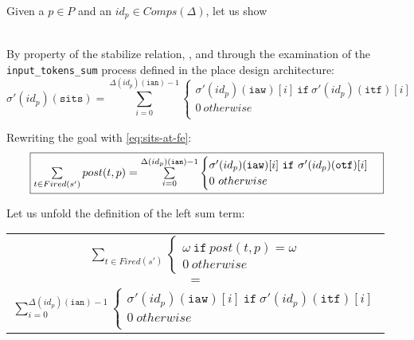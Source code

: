 \documentclass[dvipsnames,12pt]{article}
\begin{document}
\begin{niproof}
  Given a $p\in{}P$ and an $id_p\in{}Comps(\Delta)$, let us show\\
  \\

  \exP{}
  
  By property of the stabilize relation, \InCsCompP, and through the
  examination of the \texttt{input_tokens_sum} process defined in the
  place design architecture:
  \begin{equation}
    \label{eq:sits-at-fe}
    \sigma'(id_p)(\texttt{sits})=\sum\limits_{i=0}^{\Delta(id_p)(\texttt{ian})-1}
    \begin{cases}
      \sigma'(id_p)(\texttt{iaw})[i]~\mathtt{if}~\sigma'(id_p)(\texttt{itf})[i]\\
      0~otherwise \\
    \end{cases}
  \end{equation}

  Rewriting the goal with \eqref{eq:sits-at-fe}:\\
  \begin{equation*}
    \fbox{$
      \sum\limits_{t\in{}Fired(s')}post(t,p)=\sum\limits_{i=0}^{\Delta(id_p)(\texttt{ian})-1}
      \begin{cases}
        \sigma'(id_p)(\texttt{iaw})[i]~\mathtt{if}~\sigma'(id_p)(\texttt{otf})[i]\\
        0~otherwise \\
      \end{cases}$}
  \end{equation*}

  Let us unfold the definition of the left sum term:\\
  \begin{frameb}
    \begin{tabular}{c} $\sum\limits_{t\in{}Fired(s')}
      \begin{cases}
        \omega~\mathtt{if}~post(t,p)=\omega \\
        0~otherwise
      \end{cases}$ \\
      $=$ \\
      $\sum\limits_{i=0}^{\Delta(id_p)(\texttt{ian})-1}
      \begin{cases}
        \sigma'(id_p)(\texttt{iaw})[i]~\mathtt{if}~\sigma'(id_p)(\texttt{itf})[i]\\
        0~otherwise \\
      \end{cases}$ \\
    \end{tabular}
  \end{frameb}
  

\end{niproof}
\end{document}
